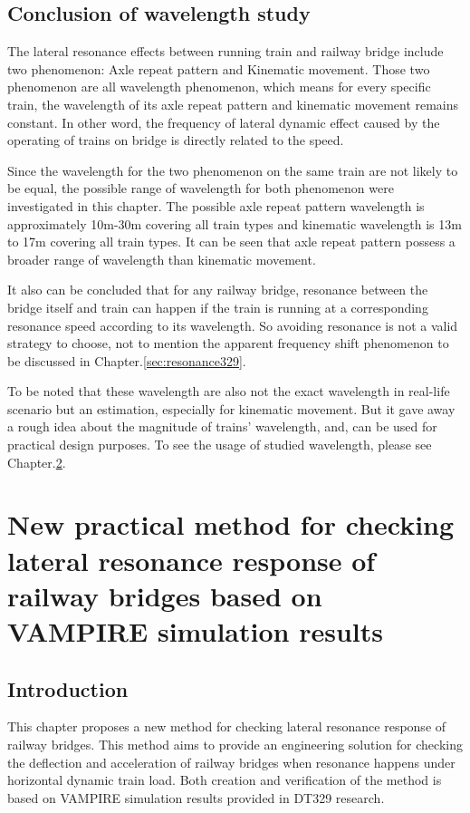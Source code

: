 \section{Conclusion of wavelength study}

The lateral resonance effects between running train and railway bridge include two phenomenon: Axle repeat pattern and Kinematic movement. Those two phenomenon are all wavelength phenomenon, which means for every specific train, the wavelength of its axle repeat pattern and kinematic movement remains constant. In other word, the frequency of lateral dynamic effect caused by the operating of trains on bridge is directly related to the speed.

Since the wavelength for the two phenomenon on the same train are not likely to be equal, the possible range of wavelength for both phenomenon were investigated in this chapter. The possible axle repeat pattern wavelength is approximately 10m-30m covering all train types and kinematic wavelength is 13m to 17m covering all train types. It can be seen that axle repeat pattern possess a broader range of wavelength than kinematic movement.

It also can be concluded that for any railway bridge, resonance between the bridge itself and train can happen if the train is running at a corresponding resonance speed according to its wavelength. So avoiding resonance is not a valid strategy to choose, not to mention the apparent frequency shift phenomenon to be discussed in Chapter.\ref{sec:resonance329}. 

To be noted that these wavelength are also not the exact wavelength in real-life scenario but an estimation, especially for kinematic movement. But it gave away a rough idea about the magnitude of trains' wavelength, and, can be used for practical design purposes. To see the usage of studied wavelength, please see Chapter.\ref{sec:parcticalmethod}.

\chapter{New practical method for checking lateral resonance response of railway bridges based on VAMPIRE simulation results }\label{sec:parcticalmethod}

\section{Introduction}

This chapter proposes a new method for checking lateral resonance response of railway bridges. This method aims to provide an engineering solution for checking the deflection and acceleration of railway bridges when resonance happens under horizontal dynamic train load. Both creation and verification of the method is based on VAMPIRE simulation results provided in DT329 research.

